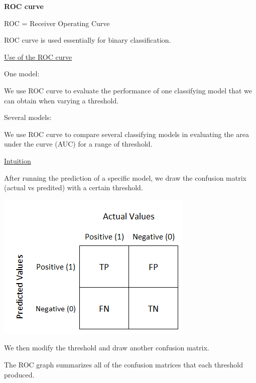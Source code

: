 {\fontsize{12pt}{22pt} \textbf{ROC curve}\par}

\vspace{5mm}

ROC = Receiver Operating Curve

ROC curve is used essentially for binary classification.

\vspace{5mm}

\underline{Use of the ROC curve}

\vspace{5mm}

One model:

We use ROC curve to evaluate the performance of one classifying model that we can obtain when varying a threshold.

\vspace{5mm}

Several models:

We use ROC curve to compare several classifying models in evaluating the area under the curve (AUC) for a range of threshold.

\vspace{5mm}

\underline{Intuition}

\vspace{5mm}

After running the prediction of a specific model, we draw the confusion matrix (actual vs predited) with a certain threshold.

\includegraphics[scale=0.5]{../images/confusionmatrice.png}

\vspace{5mm}

We then modify the threshold and draw another confusion matrix.

The ROC graph summarizes all of the confusion matrices that each threshold produced.


